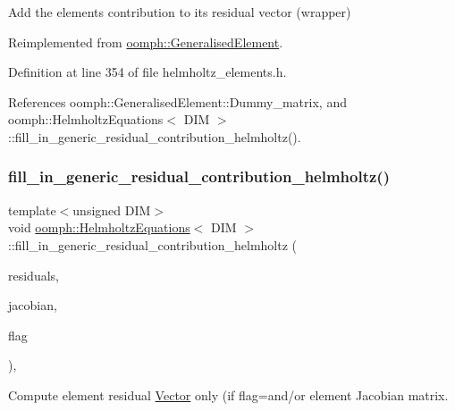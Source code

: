 Add the element\textquotesingle{}s contribution to its residual vector (wrapper) 



Reimplemented from \hyperlink{classoomph_1_1GeneralisedElement_a310c97f515e8504a48179c0e72c550d7}{oomph\+::\+Generalised\+Element}.



Definition at line 354 of file helmholtz\+\_\+elements.\+h.



References oomph\+::\+Generalised\+Element\+::\+Dummy\+\_\+matrix, and oomph\+::\+Helmholtz\+Equations$<$ D\+I\+M $>$\+::fill\+\_\+in\+\_\+generic\+\_\+residual\+\_\+contribution\+\_\+helmholtz().

\mbox{\label{classoomph_1_1HelmholtzEquations_a24fbdea32fd24f0cef97d34cf99c36a3}} 
\subsubsection{\texorpdfstring{fill\+\_\+in\+\_\+generic\+\_\+residual\+\_\+contribution\+\_\+helmholtz()}{fill\_in\_generic\_residual\_contribution\_helmholtz()}}
{\footnotesize\ttfamily template$<$unsigned D\+IM$>$ \\
void \hyperlink{classoomph_1_1HelmholtzEquations}{oomph\+::\+Helmholtz\+Equations}$<$ D\+IM $>$\+::fill\+\_\+in\+\_\+generic\+\_\+residual\+\_\+contribution\+\_\+helmholtz (\begin{DoxyParamCaption}\item[{\hyperlink{classoomph_1_1Vector}{Vector}$<$ double $>$ \&}]{residuals,  }\item[{\hyperlink{classoomph_1_1DenseMatrix}{Dense\+Matrix}$<$ double $>$ \&}]{jacobian,  }\item[{const unsigned \&}]{flag }\end{DoxyParamCaption})\hspace{0.3cm}{\ttfamily [protected]}, {\ttfamily [virtual]}}



Compute element residual \hyperlink{classoomph_1_1Vector}{Vector} only (if flag=and/or element Jacobian matrix. 

